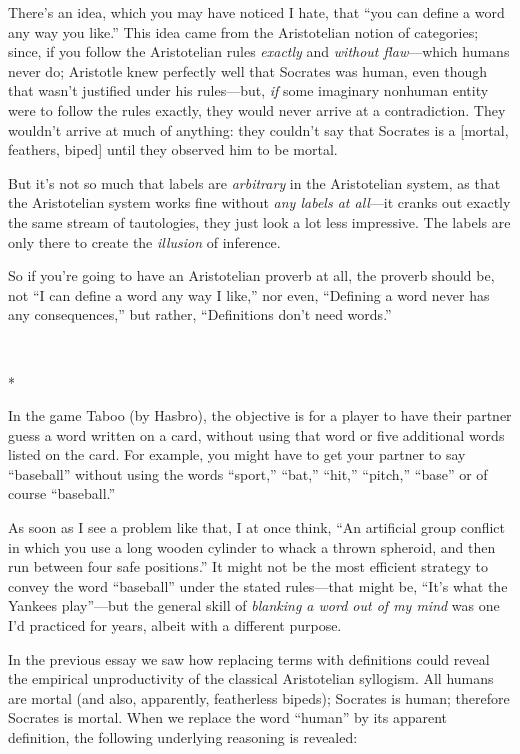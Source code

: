 {
 There's an idea, which you may have noticed I
hate, that ``you can define a word any way you
like.'' This idea came from the Aristotelian notion
of categories; since, if you follow the Aristotelian rules
\textit{exactly} and \textit{without flaw}{}---which humans never do;
Aristotle knew perfectly well that Socrates was human, even though that
wasn't justified under his rules---but, \textit{if}
some imaginary nonhuman entity were to follow the rules exactly, they
would never arrive at a contradiction. They wouldn't
arrive at much of anything: they couldn't say that
Socrates is a [mortal, {\textlnot}feathers, biped] until they observed
him to be mortal.}

{
 But it's not so much that labels are
\textit{arbitrary} in the Aristotelian system, as that the Aristotelian
system works fine without \textit{any labels at all}{}---it cranks out
exactly the same stream of tautologies, they just look a lot less
impressive. The labels are only there to create the \textit{illusion}
of inference.}

{
 So if you're going to have an Aristotelian proverb
at all, the proverb should be, not ``I can define a
word any way I like,'' nor even,
``Defining a word never has any
consequences,'' but rather,
``Definitions don't need
words.''}

{\centering
 \ ~
\par}

{\centering
 *
\par}


{
 In the game Taboo (by Hasbro), the objective is for a player to
have their partner guess a word written on a card, without using that
word or five additional words listed on the card. For example, you
might have to get your partner to say
``baseball'' without using the words
``sport,''
``bat,''
``hit,''
``pitch,''
``base'' or of course
``baseball.'' }

{
 As soon as I see a problem like that, I at once think,
``An artificial group conflict in which you use a long
wooden cylinder to whack a thrown spheroid, and then run between four
safe positions.'' It might not be the most efficient
strategy to convey the word
``baseball'' under the stated
rules---that might be, ``It's what the
Yankees play''---but the general skill of
\textit{blanking a word out of my mind} was one I'd
practiced for years, albeit with a different purpose.}

{
 In the previous essay we saw how replacing terms with definitions
could reveal the empirical unproductivity of the classical Aristotelian
syllogism. All humans are mortal (and also, apparently, featherless
bipeds); Socrates is human; therefore Socrates is mortal. When we
replace the word ``human'' by its
apparent definition, the following underlying reasoning is revealed:}

